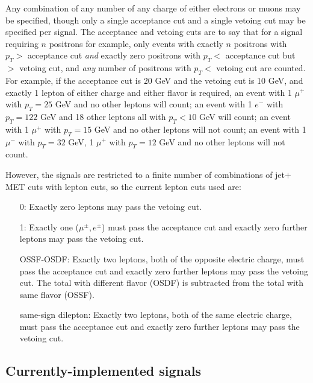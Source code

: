 \documentclass[10pt]{article}
\begin{document}
Any combination of any number of any charge of either electrons or muons may be
 specified, though only a single acceptance cut and a single vetoing cut may be
 specified per signal. The acceptance and vetoing cuts are to say that for a
 signal requiring $n$ positrons for example, only events with exactly
 $n$ positrons with $p_{T} >$ acceptance cut {\em{and}} exactly zero positrons
 with $p_{T} <$ acceptance cut but $>$ vetoing cut, and {\em{any}} number of
 positrons with $p_{T} <$ vetoing cut are counted. For example, if the
 acceptance cut is 20 GeV and the vetoing cut is 10 GeV, and exactly 1 lepton
 of either charge and either flavor is required, an event with 1 ${\mu}^{+}$
 with $p_{T} = 25$ GeV and no other leptons will count; an event with 1 $e^{-}$
 with $p_{T} = 122$ GeV and 18 other leptons all with $p_{T} < 10$ GeV will
 count; an event with 1 ${\mu}^{+}$ with $p_{T} = 15$ GeV and no other leptons
 will not count; an event with 1 ${\mu}^{-}$ with $p_{T} = 32$ GeV,
 1 ${\mu}^{+}$ with $p_{T} = 12$ GeV and no other leptons will not count.

However, the signals are restricted to a finite number of combinations of
 jet$+$MET cuts with lepton cuts, so the current lepton cuts used are:
\begin{itemize}

\item[0:] Exactly zero leptons may pass the vetoing cut.

\item[1:] Exactly one (${\mu}^{\pm}, e^{\pm}$) must pass the acceptance cut
          and exactly zero further leptons may pass the vetoing cut.

\item[OSSF-OSDF:] Exactly two leptons, both of the opposite electric
                  charge, must pass the acceptance cut and exactly zero further
                  leptons may pass the vetoing cut. The total with different
                  flavor (OSDF) is subtracted from the total with same flavor
                  (OSSF).

\item[same-sign dilepton:] Exactly two leptons, both of the same electric
                           charge, must pass the acceptance cut and exactly zero
                           further leptons may pass the vetoing cut.

\end{itemize}


\subsection{Currently-implemented signals}
\label{subsec:currentSignals}
\end{document}
